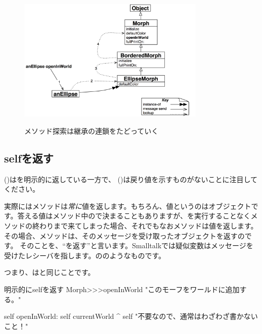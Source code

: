 \documentclass[a4paper,10pt,twoside]{book}
\begin{document}
\begin{figure}[htb]
\begin{center}
	{\includegraphics[width=0.8\textwidth]{openInWorldLookup}}
\caption{メソッド探索は継承の連鎖をたどっていく}
\end{center}
\end{figure}

\subsection{selfを返す} 

 ()はを明示的に返している一方で、 ()は戻り値を示すものがないことに注目してください。

実際にはメソッドは\emph{常に}値を返します。もちろん、値というのはオブジェクトです。答える値はメソッド中の\ct{^}で決まることもありますが、\ct{^}を実行することなくメソッドの終わりまで来てしまった場合、それでもなおメソッドは値を返します。その場合、メソッドは、そのメッセージを受け取ったオブジェクトを返すのです。
そのことを、``\self を返す''と言います。Smalltalkでは疑似変数\self はメッセージを受けたレシーバを指します。ののようなものです。

つまり、はと同じことです。

\begin{method}[openInWorldReturnSelf]{明示的にselfを返す}
Morph>>>openInWorld
	"このモーフをワールドに追加する。"
	
    self openInWorld: self currentWorld
	^ self		"不要なので、通常はわざわざ書かないこと！"
\end{method}
\end{document}
